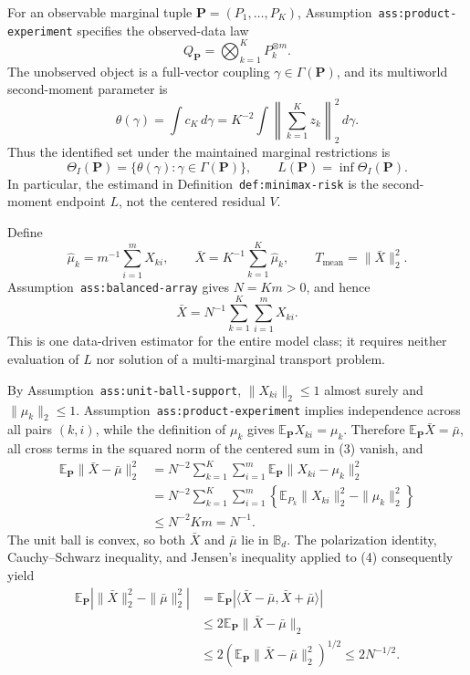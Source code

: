 For an observable marginal tuple \(\mathbf P=(P_1,\ldots,P_K)\), Assumption~\texttt{ass:product-experiment} specifies the observed-data law
\[
Q_{\mathbf P}=\bigotimes_{k=1}^K P_k^{\otimes m}.
\]
The unobserved object is a full-vector coupling \(\gamma\in\Gamma(\mathbf P)\), and its multiworld second-moment parameter is
\[
\theta(\gamma)=\int c_K\,d\gamma
=K^{-2}\int\left\|\sum_{k=1}^K z_k\right\|_2^2\,d\gamma.
\]
Thus the identified set under the maintained marginal restrictions is
\[
\Theta_I(\mathbf P)=\{\theta(\gamma):\gamma\in\Gamma(\mathbf P)\},
\qquad
L(\mathbf P)=\inf\Theta_I(\mathbf P).
\tag{1}
\]
In particular, the estimand in Definition~\texttt{def:minimax-risk} is the second-moment endpoint \(L\), not the centered residual \(V\).

Define
\[
\widehat\mu_k=m^{-1}\sum_{i=1}^m X_{ki},
\qquad
\bar X=K^{-1}\sum_{k=1}^K\widehat\mu_k,
\qquad
T_{\mathrm{mean}}=\|\bar X\|_2^2.
\tag{2}
\]
Assumption~\texttt{ass:balanced-array} gives \(N=Km>0\), and hence
\[
\bar X=N^{-1}\sum_{k=1}^K\sum_{i=1}^m X_{ki}.
\tag{3}
\]
This is one data-driven estimator for the entire model class; it requires neither evaluation of \(\widehat L\) nor solution of a multi-marginal transport problem.

By Assumption~\texttt{ass:unit-ball-support}, \(\|X_{ki}\|_2\leq 1\) almost surely and \(\|\mu_k\|_2\leq 1\).  Assumption~\texttt{ass:product-experiment} implies independence across all pairs \((k,i)\), while the definition of \(\mu_k\) gives \(\mathbb E_{\mathbf P}X_{ki}=\mu_k\).  Therefore \(\mathbb E_{\mathbf P}\bar X=\bar\mu\), all cross terms in the squared norm of the centered sum in (3) vanish, and
\[
\begin{aligned}
\mathbb E_{\mathbf P}\|\bar X-\bar\mu\|_2^2
&=N^{-2}\sum_{k=1}^K\sum_{i=1}^m
  \mathbb E_{\mathbf P}\|X_{ki}-\mu_k\|_2^2\\
&=N^{-2}\sum_{k=1}^K\sum_{i=1}^m
  \left\{\mathbb E_{P_k}\|X_{ki}\|_2^2-\|\mu_k\|_2^2\right\}\\
&\leq N^{-2}Km=N^{-1}.
\end{aligned}
\tag{4}
\]
The unit ball is convex, so both \(\bar X\) and \(\bar\mu\) lie in \(\mathbb B_d\).  The polarization identity, Cauchy--Schwarz inequality, and Jensen's inequality applied to (4) consequently yield
\[
\begin{aligned}
\mathbb E_{\mathbf P}\left|\|\bar X\|_2^2-\|\bar\mu\|_2^2\right|
&=\mathbb E_{\mathbf P}
  \left|\langle\bar X-\bar\mu,\bar X+\bar\mu\rangle\right|\\
&\leq 2\mathbb E_{\mathbf P}\|\bar X-\bar\mu\|_2\\
&\leq 2\left(\mathbb E_{\mathbf P}\|\bar X-\bar\mu\|_2^2\right)^{1/2}
\leq 2N^{-1/2}.
\end{aligned}
\tag{5}
\]

